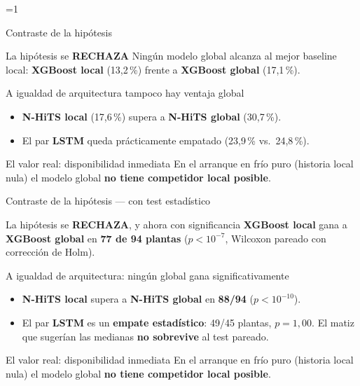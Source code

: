 \documentclass[10pt,aspectratio=169]{beamer}
\providecommand{\minmode}{0}
\newcommand{\gl}[1]{\textcolor{glob}{\textbf{#1}}}
\newcommand{\lo}[1]{\textcolor{loc}{\textbf{#1}}}
\newcommand{\rj}[1]{\textcolor{alertred}{\textbf{#1}}}
\begin{document}
\ifnum\minmode=1
\begin{frame}{Contraste de la hipótesis}
  \begin{alertblock}{La hipótesis se \textbf{RECHAZA}}
    Ningún modelo global alcanza al mejor baseline local:
    \lo{XGBoost local} (13,2\,\%) frente a \gl{XGBoost global} (17,1\,\%).
  \end{alertblock}
  \begin{block}{A igualdad de arquitectura tampoco hay ventaja global}
    \begin{itemize}
      \item \lo{N-HiTS local} (17,6\,\%) supera a \gl{N-HiTS global} (30,7\,\%).
      \item El par \textbf{LSTM} queda prácticamente empatado (23,9\,\% vs.\ 24,8\,\%).
    \end{itemize}
  \end{block}
  \begin{exampleblock}{El valor real: disponibilidad inmediata}
    En el arranque en frío puro (historia local nula) el modelo global \textbf{no tiene competidor local posible}.
  \end{exampleblock}
\end{frame}
\else
\begin{frame}{Contraste de la hipótesis --- con test estadístico}
  \begin{alertblock}{La hipótesis se \textbf{RECHAZA}, y ahora con significancia}
    \lo{XGBoost local} gana a \gl{XGBoost global} en \textbf{77 de 94 plantas}
    ($p<10^{-7}$, Wilcoxon pareado con corrección de Holm).
  \end{alertblock}
  \begin{block}{A igualdad de arquitectura: ningún global gana significativamente}
    \begin{itemize}
      \item \lo{N-HiTS local} supera a \gl{N-HiTS global} en \textbf{88/94} ($p<10^{-10}$).
      \item El par \textbf{LSTM} es un \rj{empate estadístico}: 49/45 plantas, $p=1{,}00$.
            El matiz que sugerían las medianas \textbf{no sobrevive} al test pareado.
    \end{itemize}
  \end{block}
  \begin{exampleblock}{El valor real: disponibilidad inmediata}
    En el arranque en frío puro (historia local nula) el modelo global \textbf{no tiene competidor local posible}.
  \end{exampleblock}
\end{frame}
\fi
\end{document}
